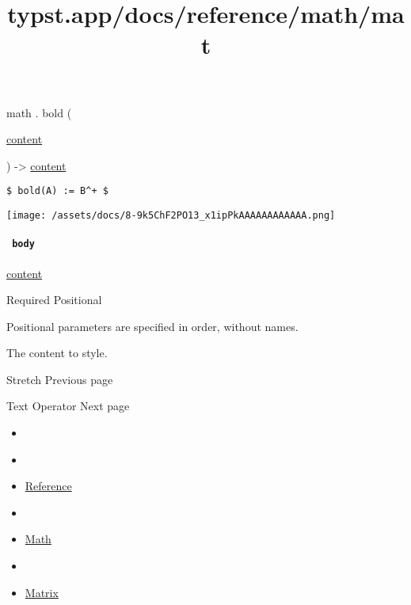 math { . } { bold } (

{ \href{/docs/reference/foundations/content/}{content} }

) -\textgreater{} \href{/docs/reference/foundations/content/}{content}

\begin{verbatim}
$ bold(A) := B^+ $
\end{verbatim}

\texttt{[image: /assets/docs/8-9k5ChF2PO13\_x1ipPkAAAAAAAAAAAA.png]}

\paragraph{\texorpdfstring{\texttt{\ body\ }}{ body }}\label{functions-bold-body}

\href{/docs/reference/foundations/content/}{content}

{Required} {{ Positional }}

\label{functions-bold-body-positional-tooltip}
Positional parameters are specified in order, without names.

The content to style.

\href{/docs/reference/math/stretch/}{\pandocbounded{}}

{ Stretch } { Previous page }

\href{/docs/reference/math/op/}{\pandocbounded{}}

{ Text Operator } { Next page }


\title{typst.app/docs/reference/math/mat}

\begin{itemize}
\tightlist
\item
  \href{/docs}{}
\item
  
\item
  \href{/docs/reference/}{Reference}
\item
  
\item
  \href{/docs/reference/math/}{Math}
\item
  
\item
  \href{/docs/reference/math/mat/}{Matrix}
\end{itemize}

